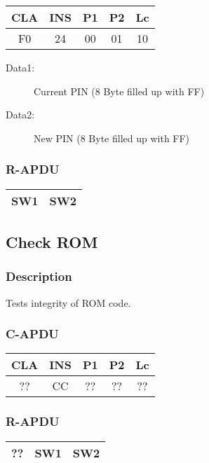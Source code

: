 \documentclass[a4paper,oneside]{article}
\begin{document}
\begin{tabular}{|c|c|c|c|c|} \hline
CLA & INS & P1 & P2 & Lc \\ \hline \hline
F0 & 24 & 00 & 01 & 10 \\ \hline
\end{tabular}

\begin{description}
\item[Data1:] Current PIN (8 Byte filled up with FF)
\item[Data2:] New PIN (8 Byte filled up with FF)
\end{description}

\subsubsection*{R-APDU}

\begin{tabular}{|c|c|} \hline
SW1 & SW2 \\ \hline
\end{tabular}


\subsection{Check ROM}

\subsubsection*{Description}

Tests integrity of ROM code.

\subsubsection*{C-APDU}

\begin{tabular}{|c|c|c|c|c|} \hline
CLA & INS & P1 & P2 & Lc \\ \hline \hline
?? & CC & ?? & ?? & ?? \\ \hline
\end{tabular}

\subsubsection*{R-APDU}

\begin{tabular}{|c|c|c|} \hline
?? & SW1 & SW2 \\ \hline
\end{tabular}
\end{document}
